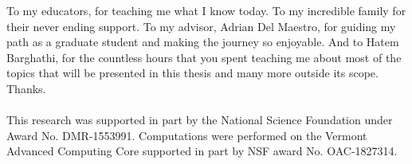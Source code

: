 \begin{singlespace}
To my educators, for teaching me what I know today. To my incredible family for their never ending support. To my advisor, Adrian Del Maestro, for guiding my path as a graduate student and making the journey so enjoyable. And to Hatem Barghathi, for the countless hours that you spent teaching me about most of the topics that will be presented in this thesis and many more outside its scope.
\\
Thanks.
\\
\\
This research was supported in part by the National Science Foundation under Award No. DMR-1553991. Computations were performed on the Vermont Advanced Computing Core supported in part by NSF award No. OAC-1827314.

\end{singlespace}
